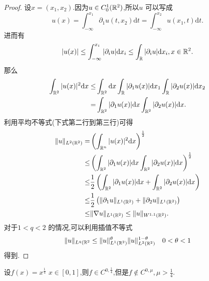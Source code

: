 \begin{proof}
  设$x=(x_1,x_2)$.因为$u\in C^{1}_0(\mathbb{R}^2)$,所以$u$ 可以写成
  \[
    u(x)=\int_{-\infty}^{x_1}\partial_1 u(t,x_2)\mathrm{d}t=\int_{-\infty}^{x_2}u(x_1,t)\mathrm{d}t.
  \] 
  进而有
  \[
    |u(x)|\le \int_{-\infty}^{x_i}|\partial_{i}u|\mathrm{d}x_i\le \int_{\mathbb{R}}|\partial_i u|\mathrm{d}x_i, x\in \mathbb{R}^2
  .\]
  那么
  \begin{align*}
    \int_{\mathbb{R}^2}|u(x)|^2\mathrm{d}x\le& \int_{\mathbb{R}^2}\mathrm{d}x\int_{\mathbb{R}}|\partial_1 u(x)|\mathrm{d}x_1\int_{\mathbb{R}} |\partial_2u(x)|\mathrm{d}x_2\\
    =&\int_{\mathbb{R}^2}|\partial_1 u(x)|\mathrm{d}x \int_{\mathbb{R}^2}|\partial_2 u(x)|\mathrm{d}x
  .\end{align*}
  利用平均不等式(下式第二行到第三行)可得
  \begin{align*}
    \|u\|_{L^2(\mathbb{R}^2)}=&\left( \int_{\mathbb{R}^{n}}|u(x)|^2\mathrm{d}x \right) ^{\frac{1}{2}}\\
    \le& \left( \int_{\mathbb{R}^2}|\partial_1 u(x)|\mathrm{d}x \int_{\mathbb{R}^2}|\partial_2u(x)|\mathrm{d}x \right) ^{\frac{1}{2}}\\
    \le&\frac{1}{2}\left( \int_{\mathbb{R}^2}|\partial_1u(x)|\mathrm{d}x+\int_{\mathbb{R}^2}|\partial_2u(x)|\mathrm{d}x \right)\\
    \le &\frac{1}{2}\left( \|\partial_1u\|_{L^{1}(\mathbb{R}^2)}+\|\partial_2 u\|_{L^{1}(\mathbb{R}^2)}\right)\\
    \le  & \|\nabla  u\|_{L^{1}(\mathbb{R}^2)}\le \|u\|_{W^{1,1}(\mathbb{R}^2)}
  .\end{align*}
  对于$1<q<2$ 的情况,可以利用插值不等式
  \[
    \|u\|_{L^{q}(\mathbb{R}^2}\le \|u\|_{L^{1}(\mathbb{R}^2)}^{\theta}\|u\|^{1-\theta}_{L^{2}(\mathbb{R}^2)} \quad 0<\theta<1
  \] 
  得到.
\end{proof}
\begin{exercise}
  设$f(x)=x^{\frac{1}{4}}$ $x\in [0,1]$,则$f\in C^{0, \frac{1}{4}}$,但是$f\notin C^{0,\mu},\mu>\frac{1}{4}$. 
\end{exercise}
